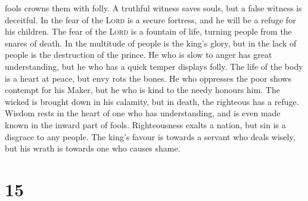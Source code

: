 fools crowns them with folly.  A truthful witness saves
souls, but a false witness is deceitful.  In the fear of
the \textsc{Lord} is a secure fortress, and he will be a refuge for his
children.  The fear of the \textsc{Lord} is a fountain of
life, turning people from the snares of death.  In the
multitude of people is the king's glory, but in the lack of people is
the destruction of the prince.  He who is slow to anger
has great understanding, but he who has a quick temper displays folly.
 The life of the body is a heart at peace, but envy rots
the bones.  He who oppresses the poor shows contempt for
his Maker, but he who is kind to the needy honours him. 
The wicked is brought down in his calamity, but in death, the righteous
has a refuge.  Wisdom rests in the heart of one who has
understanding, and is even made known in the inward part of fools.
 Righteousness exalts a nation, but sin is a disgrace to
any people.  The king's favour is towards a servant who
deals wisely, but his wrath is towards one who causes shame.

\hypertarget{section-14}{%
\section{15}\label{section-14}}

